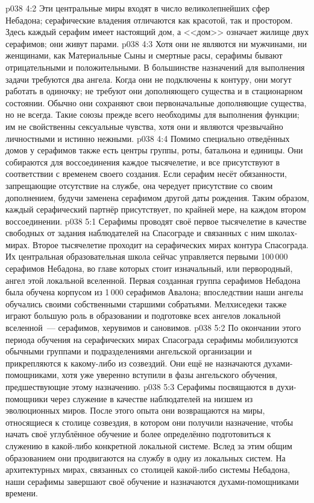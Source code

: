 \vs p038 4:2 Эти центральные миры входят в число великолепнейших сфер Небадона; серафические владения отличаются как красотой, так и простором. Здесь каждый серафим имеет настоящий дом, а <<дом>> означает жилище двух серафимов; они живут парами.
\vs p038 4:3 \pc Хотя они не являются ни мужчинами, ни женщинами, как Материальные Сыны и смертные расы, серафимы бывают отрицательными и положительными. В большинстве назначений для выполнения задачи требуются два ангела. Когда они не подключены к контуру, они могут работать в одиночку; не требуют они дополняющего существа и в стационарном состоянии. Обычно они сохраняют свои первоначальные дополняющие существа, но не всегда. Такие союзы прежде всего необходимы для выполнения функции; им не свойственны сексуальные чувства, хотя они и являются чрезвычайно личностными и истинно нежными.
\vs p038 4:4 Помимо специально отведённых домов у серафимов также есть центры группы, роты, батальона и единицы. Они собираются для воссоединения каждое тысячелетие, и все присутствуют в соответствии с временем своего создания. Если серафим несёт обязанности, запрещающие отсутствие на службе, она чередует присутствие со своим дополнением, будучи заменена серафимом другой даты рождения. Таким образом, каждый серафический партнёр присутствует, по крайней мере, на каждом втором воссоединении.
\vs p038 5:1 Серафимы проводят своё первое тысячелетие в качестве свободных от задания наблюдателей на Спасограде и связанных с ним школах\hyp{}мирах. Второе тысячелетие проходит на серафических мирах контура Спасограда. Их центральная образовательная школа сейчас управляется первыми 100\,000 серафимов Небадона, во главе которых стоит изначальный, или первородный, ангел этой локальной вселенной. Первая созданная группа серафимов Небадона была обучена корпусом из 1\,000 серафимов Авалона; впоследствии наши ангелы обучались своими собственными старшими собратьями. Мелхиседеки также играют большую роль в образовании и подготовке всех ангелов локальной вселенной~--- серафимов, херувимов и сановимов.
\vs p038 5:2 По окончании этого периода обучения на серафических мирах Спасограда серафимы мобилизуются обычными группами и подразделениями ангельской организации и прикрепляются к какому\hyp{}либо из созвездий. Они ещё не назначаются духами\hyp{}помощниками, хотя уже уверенно вступили в фазы ангельского обучения, предшествующие этому назначению.
\vs p038 5:3 Серафимы посвящаются в духи\hyp{}помощники через служение в качестве наблюдателей на низшем из эволюционных миров. После этого опыта они возвращаются на миры, относящиеся к столице созвездия, в котором они получили назначение, чтобы начать своё углублённое обучение и более определённо подготовиться к служению в какой\hyp{}либо конкретной локальной системе. Вслед за этим общим образованием они продвигаются на службу в одну из локальных систем. На архитектурных мирах, связанных со столицей какой\hyp{}либо системы Небадона, наши серафимы завершают своё обучение и назначаются духами\hyp{}помощниками времени.

